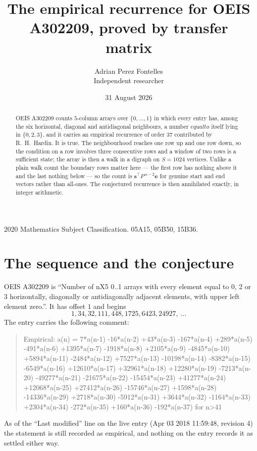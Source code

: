 \documentclass[11pt,a4paper]{article}
\title{The empirical recurrence for OEIS A302209, proved by transfer matrix}
\author{Adrian Perez Fontelles\\ \small Independent researcher}
\date{31 August 2026}
\theoremstyle{plain}
\theoremstyle{definition}
\begin{document}
\maketitle

\begin{abstract}
OEIS A302209 counts $5$-column arrays over $\{0,\dots,1\}$ in which every entry has,
among the six horizontal, diagonal and antidiagonal neighbours, a number $equal to$ itself lying in $\{0,2,3\}$, and it carries an empirical
recurrence of order $37$ contributed by R.~H.~Hardin. It is true. The neighbourhood
reaches one row up and one row down, so the condition on a row involves three consecutive
rows and a window of two rows is a sufficient state; the array is then a walk in a digraph
on $S=1024$ vertices. Unlike a plain walk count the boundary rows matter here --- the first
row has nothing above it and the last nothing below --- so the count is
$\mathbf{s}^{\!\top}P^{\,n-2}\mathbf{e}$ for genuine start and end vectors rather than
all-ones. The conjectured recurrence is then annihilated exactly, in integer arithmetic.
\end{abstract}

\noindent\small 2020 Mathematics Subject Classification. 05A15, 05B50, 15B36.\normalsize

\section{The sequence and the conjecture}

OEIS A302209 is ``Number of nX5 0..1 arrays with every element equal to 0, 2 or 3 horizontally, diagonally or antidiagonally adjacent elements, with upper left element zero.''. It has offset
$1$ and begins
\[
1, 34, 32, 111, 448, 1725, 6423, 24927,\ \dots
\]
The entry carries the following comment:
\begin{quote}\small
Empirical: a(n) = 7*a(n-1) -16*a(n-2) +43*a(n-3) -167*a(n-4) +289*a(n-5) -491*a(n-6) +1395*a(n-7) -1918*a(n-8) +2105*a(n-9) -4845*a(n-10) +5894*a(n-11) -2484*a(n-12) +7527*a(n-13) -10198*a(n-14) -8382*a(n-15) -6549*a(n-16) +12610*a(n-17) +32961*a(n-18) +12280*a(n-19) -7213*a(n-20) -49277*a(n-21) -21675*a(n-22) -15454*a(n-23) +41277*a(n-24) +12068*a(n-25) +27412*a(n-26) -15746*a(n-27) +1598*a(n-28) -14336*a(n-29) +2718*a(n-30) -5912*a(n-31) +3644*a(n-32) -1164*a(n-33) +2304*a(n-34) -272*a(n-35) +160*a(n-36) -192*a(n-37) for n>41
\end{quote}
As of the ``Last modified'' line on the live entry (Apr 03 2018 11:59:48, revision
4) the statement is still recorded as empirical, and nothing on the entry
records it as settled either way.
\end{document}
